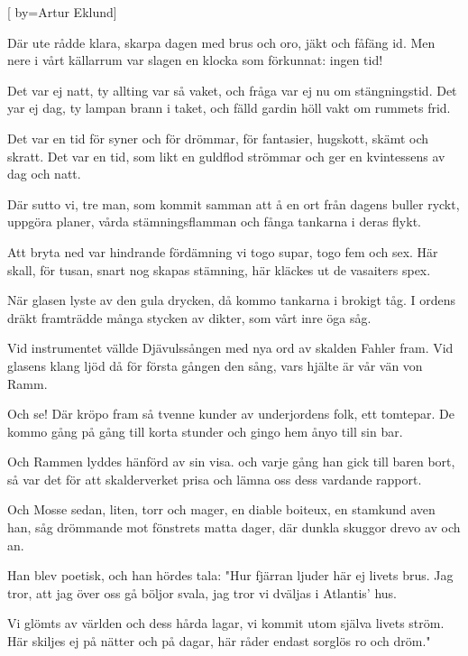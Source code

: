 
[
	by={Artur Eklund}]

\beginverse*
Där ute rådde klara, skarpa dagen
med brus och oro, jäkt och fåfäng id.
Men nere i vårt källarrum var slagen
en klocka som förkunnat: ingen tid!
\endverse

\beginverse*
Det var ej natt, ty allting var så vaket,
och fråga var ej nu om stängningstid.
Det yar ej dag, ty lampan brann i taket,
och fälld gardin höll vakt om rummets frid.
\endverse

\beginverse*
Det var en tid för syner och för drömmar,
för fantasier, hugskott, skämt och skratt.
Det var en tid, som likt en guldflod strömmar
och ger en kvintessens av dag och natt.
\endverse

\beginverse*
Där sutto vi, tre man, som kommit samman
att å en ort från dagens buller ryckt,
uppgöra planer, vårda stämningsflamman
och fånga tankarna i deras flykt.
\endverse

\beginverse*
Att bryta ned var hindrande fördämning
vi togo supar, togo fem och sex.
Här skall, för tusan, snart nog skapas stämning,
här kläckes ut de vasaiters spex.
\endverse

\beginverse*
När glasen lyste av den gula drycken,
då kommo tankarna i brokigt tåg.
I ordens dräkt framträdde många stycken
av dikter, som vårt inre öga såg.
\endverse

\beginverse*
Vid instrumentet vällde Djävulssången
med nya ord av skalden Fahler fram.
Vid glasens klang ljöd då för första gången
den sång, vars hjälte är vår vän von Ramm.
\endverse

\beginverse*
Och se! Där kröpo fram så tvenne kunder
av underjordens folk, ett tomtepar.
De kommo gång på gång till korta stunder
och gingo hem ånyo till sin bar.
\endverse

\beginverse*
Och Rammen lyddes hänförd av sin visa.
och varje gång han gick till baren bort,
så var det för att skalderverket prisa
och lämna oss dess vardande rapport.
\endverse

\beginverse*
Och Mosse sedan, liten, torr och mager,
en diable boiteux, en stamkund aven han,
såg drömmande mot fönstrets matta dager,
där dunkla skuggor drevo av och an.
\endverse

\beginverse*
Han blev poetisk, och han hördes tala:
"Hur fjärran ljuder här ej livets brus.
Jag tror, att jag över oss gå böljor svala,
jag tror vi dväljas i Atlantis' hus.
\endverse

\beginverse*
Vi glömts av världen och dess hårda lagar,
vi kommit utom själva livets ström.
Här skiljes ej på nätter och på dagar,
här råder endast sorglös ro och dröm."
\endverse

